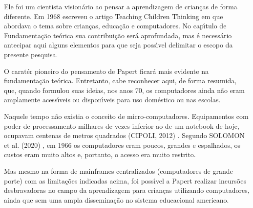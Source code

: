 \documentclass[
12pt,		%
openright,	%
twoside,  %
a4paper,			%
chapter=TITLE,		%
english,			%
french,				%
spanish,			%
brazil				%
]{USPSC-classe/USPSC}
\begin{document}
Ele foi um cientista vision\'ario ao pensar a aprendizagem de crian\c{c}as de forma diferente. Em 1968 escreveu o artigo \textquotedbl  Teaching Children Thinking \textquotedbl   em que abordava  o tema sobre crian\c{c}as, educa\c{c}\~ao e computadores. No cap\'{\i}tulo de Fundamenta\c{c}\~ao te\'orica sua contribui\c{c}\~ao ser\'a aprofundada, mas \'e necess\'ario antecipar aqui alguns elementos para que seja poss\'{\i}vel delimitar o escopo da presente pesquisa.

















O carat\'er pioneiro do pensamento de Papert ficar\'a mais evidente na fundamenta\c{c}\~ao te\'orica. Entretanto, cabe reconhecer aqui, de forma resumida, que, quando formulou suas ideias, nos anos 70, os computadores  ainda n\~ao eram amplamente acess\'{\i}veis ou dispon\'{\i}veis para uso dom\'estico ou nas escolas.

















Naquele tempo n\~ao existia o conceito de \textquotedbl micro-computadores\textquotedbl . Equipamentos com poder de processamento milhares de vezes inferior ao de um notebook de hoje, ocupavam centenas de metros quadrados  (CIPOLI, 2012) . Segundo  SOLOMON et al. (2020) , \textquotedbl em 1966 os computadores eram poucos, grandes e espalhados\textquotedbl , os custos eram muito altos e, portanto, o acesso era muito restrito.

















Mas mesmo na forma de mainframes centralizados (computadores de grande porte) com as limita\c{c}\~oes indicadas acima, foi poss\'{\i}vel a Papert realizar incurs\~oes desbravadoras no campo da aprendizagem para crian\c{c}as utilizando computadores, ainda que sem uma ampla dissemina\c{c}\~ao no sistema educacional americano.
\end{document}
